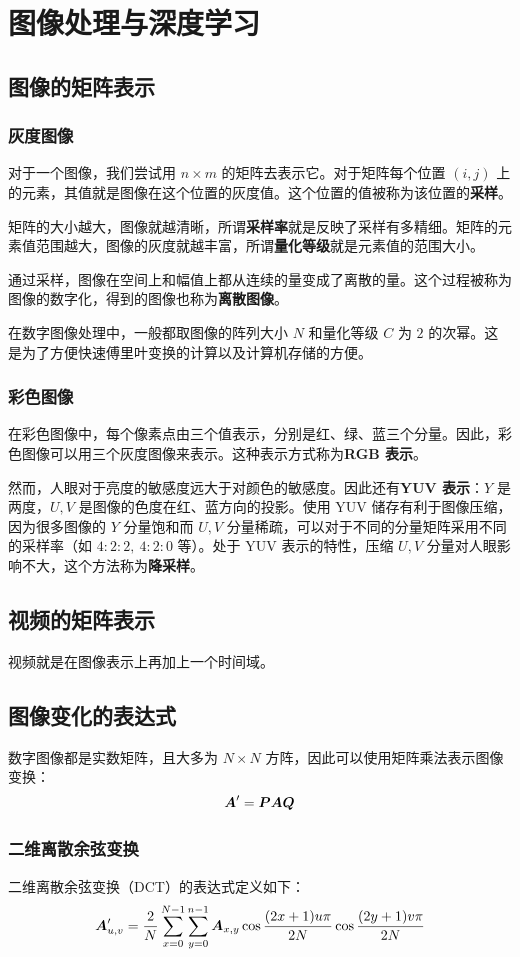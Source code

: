 \section{图像处理与深度学习}

\subsection{图像的矩阵表示}

\subsubsection{灰度图像}

对于一个图像，我们尝试用 $n \times m$ 的矩阵去表示它。对于矩阵每个位置 $(i, j)$ 上的元素，其值就是图像在这个位置的灰度值。这个位置的值被称为该位置的\textbf{采样}。

矩阵的大小越大，图像就越清晰，所谓\textbf{采样率}就是反映了采样有多精细。矩阵的元素值范围越大，图像的灰度就越丰富，所谓\textbf{量化等级}就是元素值的范围大小。

通过采样，图像在空间上和幅值上都从连续的量变成了离散的量。这个过程被称为图像的数字化，得到的图像也称为\textbf{离散图像}。

在数字图像处理中，一般都取图像的阵列大小 $N$ 和量化等级 $C$ 为 $2$ 的次幂。这是为了方便快速傅里叶变换的计算以及计算机存储的方便。

\subsubsection{彩色图像}

在彩色图像中，每个像素点由三个值表示，分别是红、绿、蓝三个分量。因此，彩色图像可以用三个灰度图像来表示。这种表示方式称为\textbf{RGB 表示}。

然而，人眼对于亮度的敏感度远大于对颜色的敏感度。因此还有\textbf{YUV 表示}：$Y$ 是两度，$U, V$ 是图像的色度在红、蓝方向的投影。使用 YUV 储存有利于图像压缩，因为很多图像的 $Y$ 分量饱和而 $U, V$ 分量稀疏，可以对于不同的分量矩阵采用不同的采样率（如 $4:2:2,\ 4:2:0$ 等）。处于 YUV 表示的特性，压缩 $U, V$ 分量对人眼影响不大，这个方法称为\textbf{降采样}。

\subsection{视频的矩阵表示}

视频就是在图像表示上再加上一个时间域。

\subsection{图像变化的表达式}

数字图像都是实数矩阵，且大多为 $N \times N$ 方阵，因此可以使用矩阵乘法表示图像变换：
$$
\boldsymbol{A}' = \boldsymbol{P} \boldsymbol{A} \boldsymbol{Q}
$$

\subsubsection{二维离散余弦变换}

二维离散余弦变换（DCT）的表达式定义如下：
$$
\boldsymbol{A}'_{u, v} = \frac{2}{N} \sum_{x = 0}^{N - 1} \sum_{y = 0}^{n - 1} \boldsymbol{A}_{x, y} \cos \frac{(2x + 1) u \pi}{2 N} \cos \frac{(2y + 1) v \pi}{2 N}
$$
